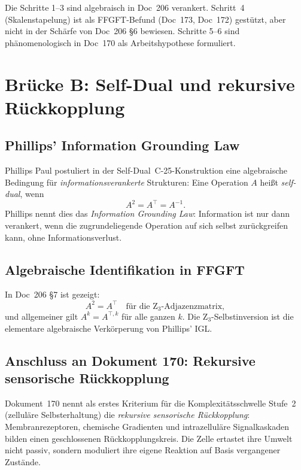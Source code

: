 Die Schritte 1--3 sind algebraisch in Doc~206 verankert. Schritt~4 (Skalenstapelung) ist als FFGFT-Befund (Doc~173, Doc~172) gestützt, aber nicht in der Schärfe von Doc~206 \S6 bewiesen. Schritte 5--6 sind phänomenologisch in Doc~170 als Arbeitshypothese formuliert.

\section{Brücke B: Self-Dual und rekursive Rückkopplung}\label{sec:brueckeB}

\subsection{Phillips' Information Grounding Law}

Phillips Paul postuliert in der Self-Dual~C-25-Konstruktion eine algebraische Bedingung für \emph{informationsverankerte} Strukturen: Eine Operation $A$ heißt \emph{self-dual}, wenn
\begin{equation}
A^2 = A^\top = A^{-1}.
\end{equation}
Phillips nennt dies das \emph{Information Grounding Law}: Information ist nur dann verankert, wenn die zugrundeliegende Operation auf sich selbst zurückgreifen kann, ohne Informationsverlust.

\subsection{Algebraische Identifikation in FFGFT}

In Doc~206 \S7 ist gezeigt:
\begin{equation}
A^2 = A^\top \quad \text{für die Z}_3\text{-Adjazenzmatrix},
\end{equation}
und allgemeiner gilt $A^k = A^{\top, k}$ für alle ganzen $k$. Die Z$_3$-Selbstinversion ist die elementare algebraische Verkörperung von Phillips' IGL.

\subsection{Anschluss an Dokument 170: Rekursive sensorische Rückkopplung}

Dokument~170 nennt als erstes Kriterium für die Komplexitätsschwelle Stufe~2 (zelluläre Selbsterhaltung) die \emph{rekursive sensorische Rückkopplung}: Membranrezeptoren, chemische Gradienten und intrazelluläre Signalkaskaden bilden einen geschlossenen Rückkopplungskreis. Die Zelle ertastet ihre Umwelt nicht passiv, sondern moduliert ihre eigene Reaktion auf Basis vergangener Zustände.

